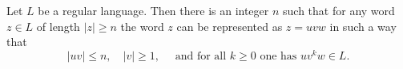 \begin{thm}
Let $L$ be a regular language.
Then there is an integer $n$ such that for any word $z \in L$ of length $|z| \ge n$ the word $z$ can be represented as $z = uvw$ in such a way that
\[
|uv| \le n, \quad |v| \ge 1, \quad \text{ and for all }k \ge 0 \text{ one has } uv^kw \in L.
\]
\end{thm}